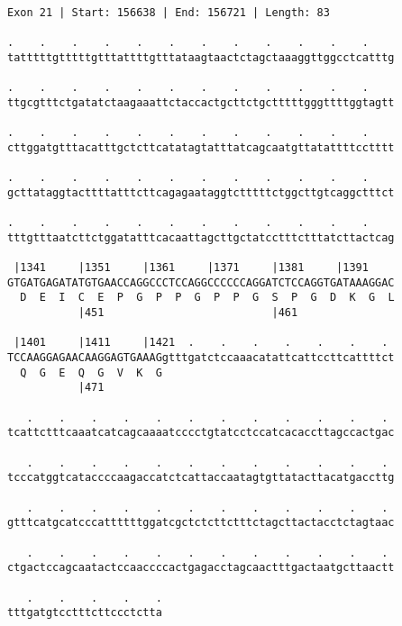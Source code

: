 \documentclass{article}
\begin{document}
\newpage
\begin{Verbatim}[fontfamily=courier]
Exon 21 | Start: 156638 | End: 156721 | Length: 83

.    .    .    .    .    .    .    .    .    .    .    .    
tatttttgtttttgtttattttgtttataagtaactctagctaaaggttggcctcatttg

.    .    .    .    .    .    .    .    .    .    .    .    
ttgcgtttctgatatctaagaaattctaccactgcttctgctttttgggttttggtagtt

.    .    .    .    .    .    .    .    .    .    .    .    
cttggatgtttacatttgctcttcatatagtatttatcagcaatgttatattttcctttt

.    .    .    .    .    .    .    .    .    .    .    .    
gcttataggtacttttatttcttcagagaataggtctttttctggcttgtcaggctttct

.    .    .    .    .    .    .    .    .    .    .    .    
tttgtttaatcttctggatatttcacaattagcttgctatcctttctttatcttactcag

 |1341     |1351     |1361     |1371     |1381     |1391    
GTGATGAGATATGTGAACCAGGCCCTCCAGGCCCCCCAGGATCTCCAGGTGATAAAGGAC
  D  E  I  C  E  P  G  P  P  G  P  P  G  S  P  G  D  K  G  L
           |451                          |461               

 |1401     |1411     |1421  .    .    .    .    .    .    . 
TCCAAGGAGAACAAGGAGTGAAAGgtttgatctccaaacatattcattccttcattttct
  Q  G  E  Q  G  V  K  G                                    
           |471                                             

   .    .    .    .    .    .    .    .    .    .    .    . 
tcattctttcaaatcatcagcaaaatcccctgtatcctccatcacaccttagccactgac

   .    .    .    .    .    .    .    .    .    .    .    . 
tcccatggtcataccccaagaccatctcattaccaatagtgttatacttacatgaccttg

   .    .    .    .    .    .    .    .    .    .    .    . 
gtttcatgcatcccattttttggatcgctctcttctttctagcttactacctctagtaac

   .    .    .    .    .    .    .    .    .    .    .    . 
ctgactccagcaatactccaaccccactgagacctagcaactttgactaatgcttaactt

   .    .    .    .    .
tttgatgtcctttcttccctctta
\end{Verbatim}
\newpage
\end{document}
